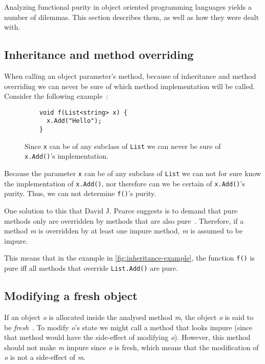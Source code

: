 \documentclass[a4paper,12pt]{article}
\begin{document}
Analyzing functional purity in object oriented programming languages yields a number of dilemmas. This section describes them, as well as how they were dealt with.

\subsection{Inheritance and method overriding} \label{sub:inheritance}

When calling an object parameter's method, because of inheritance and method overriding we can never be sure of which method implementation will be called. Consider the following example~\cite{pearce2011jpure}:

\begin{figure}[H]
  \centering
  \begin{lstlisting}
    void f(List<string> x) {
      x.Add("Hello");
    }
  \end{lstlisting}
  \caption{Since \texttt{x} can be of any subclass of \texttt{List} we can never be sure of \texttt{x.Add()}'s implementation.}
  \label{fig:inheritance-example}
\end{figure}

Because the parameter \texttt{x} can be of any subclass of \texttt{List} we can not for sure know the implementation of \texttt{x.Add()}, nor therefore can we be certain of \texttt{x.Add()}'s purity. Thus, we can not determine \texttt{f()}'s purity.

One solution to this that David J. Pearce suggests is to demand that pure methods only are overridden by methods that are also pure~\cite{pearce2011jpure}. Therefore, if a method \textit{m} is overridden by at least one impure method, \textit{m} is assumed to be impure.

This means that in the example in \autoref{fig:inheritance-example}, the function \texttt{f()} is pure iff all methods that override \texttt{List.Add()} are pure.

\subsection{Modifying a fresh object} \label{sub:modifying-fresh-objects}

If an object \textit{o} is allocated inside the analysed method \textit{m}, the object \textit{o} is said to be \textit{fresh}~\cite{pearce2011jpure}. To modify \textit{o}'s state we might call a method that looks impure (since that method would have the side-effect of modifying \textit{o}). However, this method should not make \textit{m} impure since \textit{o} is fresh, which means that the modification of \textit{o} is not a side-effect of \textit{m}.
\end{document}
